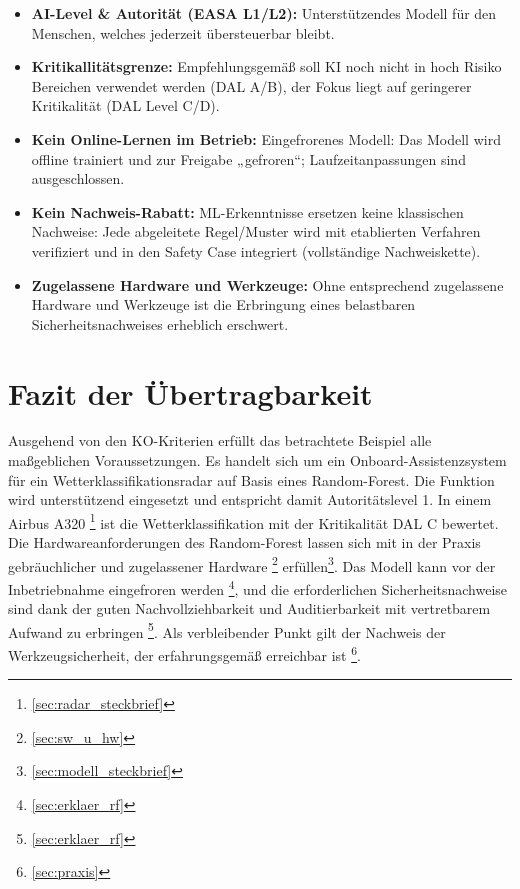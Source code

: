 \medskip
\begin{itemize}
  \item \textbf{AI-Level \& Autorität (EASA L1/L2):}
        Unterstützendes Modell für den Menschen, welches jederzeit übersteuerbar bleibt.

  \item \textbf{Kritikallitätsgrenze:}
        Empfehlungsgemäß soll KI noch nicht in hoch Risiko Bereichen verwendet werden (DAL A/B),
        der Fokus liegt auf geringerer Kritikalität (DAL Level C/D). 

  \item \textbf{Kein Online-Lernen im Betrieb:}
        Eingefrorenes Modell: Das Modell wird offline trainiert und zur Freigabe „gefroren“;
        Laufzeitanpassungen sind ausgeschlossen. 

  \item \textbf{Kein Nachweis-Rabatt:}
        ML-Erkenntnisse ersetzen keine klassischen Nachweise: Jede abgeleitete Regel/Muster wird
        mit etablierten Verfahren verifiziert und in den Safety Case integriert (vollständige Nachweiskette). 

  \item \textbf{Zugelassene Hardware und Werkzeuge:}
        Ohne entsprechend zugelassene Hardware und Werkzeuge ist die Erbringung eines belastbaren 
        Sicherheitsnachweises erheblich erschwert.
\end{itemize}


\section{Fazit der Übertragbarkeit}
Ausgehend von den KO-Kriterien erfüllt das betrachtete Beispiel alle maßgeblichen Voraussetzungen. 
Es handelt sich um ein Onboard-Assistenzsystem für ein Wetterklassifikationsradar auf Basis eines Random-Forest. 
Die Funktion wird unterstützend eingesetzt und entspricht damit Autoritätslevel 1. 
In einem Airbus A320 \footnote{\ref{sec:radar_steckbrief} } 
ist die Wetterklassifikation mit der Kritikalität DAL C bewertet. 
Die Hardwareanforderungen des Random-Forest lassen sich mit in der Praxis gebräuchlicher und zugelassener Hardware \footnote{\ref{sec:sw_u_hw} } 
erfüllen\footnote{\ref{sec:modell_steckbrief} }. 
Das Modell kann vor der Inbetriebnahme eingefroren werden \footnote{\ref{sec:erklaer_rf} }, 
und die erforderlichen Sicherheitsnachweise sind dank der 
guten Nachvollziehbarkeit und Auditierbarkeit mit vertretbarem Aufwand zu erbringen \footnote{\ref{sec:erklaer_rf} }. 
Als verbleibender Punkt gilt der Nachweis der Werkzeugsicherheit, der erfahrungsgemäß erreichbar ist \footnote{\ref{sec:praxis} }.

